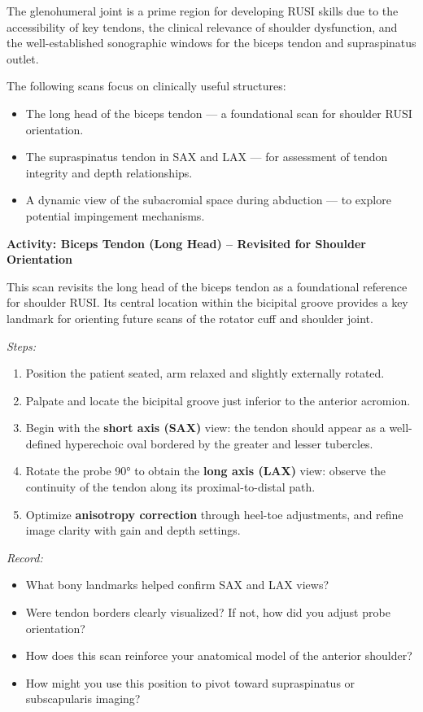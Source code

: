 The glenohumeral joint is a prime region for developing RUSI skills due to the accessibility of key tendons, the clinical relevance of shoulder dysfunction, and the well-established sonographic windows for the biceps tendon and supraspinatus outlet.

The following scans focus on clinically useful structures:
\begin{itemize}
  \item The long head of the biceps tendon — a foundational scan for shoulder RUSI orientation.
  \item The supraspinatus tendon in SAX and LAX — for assessment of tendon integrity and depth relationships.
  \item A dynamic view of the subacromial space during abduction — to explore potential impingement mechanisms.
\end{itemize}


\begin{labactivitybox}
\textbf{Activity: Biceps Tendon (Long Head) – Revisited for Shoulder Orientation}

This scan revisits the long head of the biceps tendon as a foundational reference for shoulder RUSI. Its central location within the bicipital groove provides a key landmark for orienting future scans of the rotator cuff and shoulder joint.

\textit{Steps:}
\begin{enumerate}
  \item Position the patient seated, arm relaxed and slightly externally rotated.
  \item Palpate and locate the bicipital groove just inferior to the anterior acromion.
  \item Begin with the \textbf{short axis (SAX)} view: the tendon should appear as a well-defined hyperechoic oval bordered by the greater and lesser tubercles.
  \item Rotate the probe 90° to obtain the \textbf{long axis (LAX)} view: observe the continuity of the tendon along its proximal-to-distal path.
  \item Optimize \textbf{anisotropy correction} through heel-toe adjustments, and refine image clarity with gain and depth settings.
\end{enumerate}

\textit{Record:}
\begin{itemize}
  \item What bony landmarks helped confirm SAX and LAX views?
  \item Were tendon borders clearly visualized? If not, how did you adjust probe orientation?
  \item How does this scan reinforce your anatomical model of the anterior shoulder?
  \item How might you use this position to pivot toward supraspinatus or subscapularis imaging?
\end{itemize}
\end{labactivitybox}

